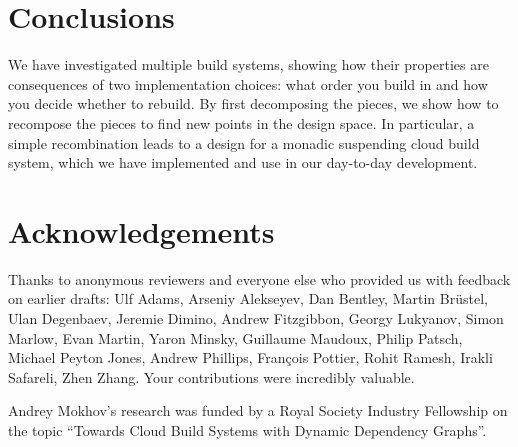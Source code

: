 \section{Conclusions}\label{sec-conclusions}

We have investigated multiple build systems, showing how their properties are
consequences of two implementation choices: what order you build in and how you
decide whether to rebuild. By first decomposing the pieces, we show how to
recompose the pieces to find new points in the design space. In particular, a
simple recombination leads to a design for a monadic suspending cloud build
system, which we have implemented and use in our day-to-day development.

\section*{Acknowledgements}

Thanks to anonymous reviewers and everyone else who provided us with feedback
on earlier drafts: Ulf Adams, Arseniy Alekseyev, Dan Bentley, Martin
Br\"{u}stel, Ulan Degenbaev, Jeremie Dimino, Andrew Fitzgibbon, Georgy
Lukyanov, Simon Marlow, Evan Martin, Yaron Minsky, Guillaume Maudoux, Philip
Patsch, Michael Peyton Jones, Andrew Phillips, Fran\c{c}ois Pottier, Rohit
Ramesh, Irakli Safareli, Zhen Zhang. Your contributions were incredibly
valuable.

Andrey Mokhov's research was funded by a Royal Society Industry Fellowship
 on the topic ``Towards Cloud Build Systems with Dynamic
Dependency Graphs''.
